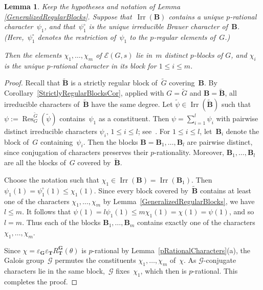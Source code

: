 \documentclass[12pt]{amsart}
\newcommand{\bG}{{\mathbf{G}}}      %
\newcommand{\bB}{{\mathbf{B}}}
\newcommand{\bT}{{\mathbf{T}}}
\DeclareMathOperator{\Res}{Res}               %
\DeclareMathOperator{\Irr}{Irr}
\newtheorem{lem}[thm]{Lemma}
\theoremstyle{theorem}
\theoremstyle{definition}
\theoremstyle{remark}
\begin{document}
\begin{lem}
\label{StrictlyRegularBlocksCorCyclic}
Keep the hypotheses and notation of 
{\rm Lemma \ref{GeneralizedRegularBlocks}}. Suppose that~$\Irr( \bB )$ contains
a unique $p$-rational character~$\psi_1$, and that~$\psi_1^{\circ}$ is the 
unique irreducible Brauer character of~$\bB$. (Here,~$\psi_1^{\circ}$ denotes 
the restriction of~$\psi_1$ to the $p$-regular elements of~$G$.)

Then the elements $\chi_1, \ldots , \chi_m$ of $\mathcal{E}( G, s )$ lie in~$m$ 
distinct $p$-blocks of $G$, and $\chi_i$ is the unique $p$-rational character 
in its block for $1 \leq i \leq m$.
\end{lem}
\begin{proof}
Recall that $\tilde{\bB}$ is a strictly regular block of~$\tilde{G}$ 
covering~$\bB$. By Corollary~\ref{StrictlyRegularBlocksCor}, applied with 
$G = \tilde{G}$ and $\bB = \tilde{\bB}$, all irreducible characters 
of~$\tilde{\bB}$ have the same degree. Let 
$\tilde{\psi} \in \Irr( \tilde{\bB} )$ such that 
$\psi := \Res_G^{\tilde{G}}( \tilde{\psi} )$ contains~$\psi_1$ as a 
constituent. Then $\psi = \sum_{i = 1}^l \psi_i$ with pairwise 
distinct irreducible characters $\psi_i$, $1 \leq i \leq l$; 
see~\cite[Section~$10$]{Lu}. For $1 \leq i \leq l$, let~$\bB_i$ denote the
block of~$G$ containing~$\psi_i$. Then the blocks $\bB = \bB_1, \ldots , \bB_l$
are pairwise distinct, since conjugation of characters preserves their 
$p$-rationality. Moreover, $\bB_1, \ldots , \bB_l$ are all the blocks of~$G$
covered by~$\tilde{\bB}$.

Choose the notation such that $\chi_1 \in \Irr( \bB ) = \Irr( \bB_1 )$. Then 
$\psi_1( 1 ) = \psi_1^{\circ}(1) \leq \chi_1(1)$. Since every block covered 
by~$\tilde{\bB}$ contains at least one of the characters 
$\chi_1, \ldots , \chi_m$ by 
Lemma~\ref{GeneralizedRegularBlocks}, we have $l \leq m$. It follows that
$\psi(1) = l\psi_1(1) \leq m\chi_1(1) = \chi(1) = \psi(1)$, and so $l = m$.
Thus each of the blocks $\bB_1, \ldots , \bB_m$ contains exactly one of the
characters $\chi_1, \ldots , \chi_m$.

Since $\chi = \varepsilon_{\bG}\varepsilon_{\bT}R_{\bT}^{\bG}( \theta )$ is 
$p$-rational by Lemma~\ref{pRationalCharacters}(a), the Galois 
group~$\mathcal{G}$ permutes the constituents $\chi_1, \ldots , \chi_m$ 
of~$\chi$. As $\mathcal{G}$-conjugate characters lie in the same 
block,~$\mathcal{G}$ fixes~$\chi_1$, which then is $p$-rational. This completes 
the proof.
\end{proof}
\end{document}
